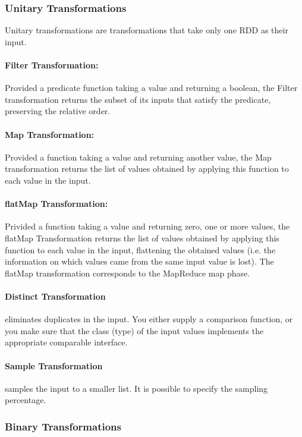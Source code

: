 \subsubsection{Unitary Transformations}

Unitary transformations are transformations that take only one RDD as their input.

\paragraph{Filter Transformation:} Provided a predicate function taking a value and returning a boolean, the Filter transformation returns the subset of its inputs that satisfy the predicate, preserving the relative order.

\paragraph{Map Transformation:} Provided a function taking a value and returning another value, the Map transformation returns the list of values obtained by applying this function to each value in the input.

\paragraph{flatMap Transformation:} Privided a function taking a value and returning zero, one or more values, the flatMap Transformation returns the list of values obtained by applying this function to each value in the input, flattening the obtained values (i.e. the information on which values came from the same input value is lost). The flatMap transformation corresponds to the MapReduce map phase.

\paragraph{Distinct Transformation} eliminates duplicates in the input. You either supply a comparison function, or you make sure that the class (type) of the input values implements the appropriate comparable interface.

\paragraph{Sample Transformation} samples the input to a smaller list. It is possible to specify the sampling percentage.


\subsubsection{Binary Transformations}

